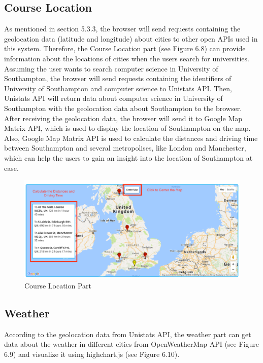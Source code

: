 \subsection{Course Location}

As mentioned in section 5.3.3, the browser will send requests containing the geolocation data (latitude and longitude) about cities to other open APIs used in this system. Therefore, the Course Location part (see Figure 6.8) can provide information about the locations of cities when the users search for universities. Assuming the user wants to search computer science in University of Southampton, the browser will send requests containing the identifiers of University of Southampton and computer science to Unistats API. Then, Unistats API will return data about computer science in University of Southampton with the geolocation data about Southampton to the browser. After receiving the geolocation data, the browser will send it to Google Map Matrix API, which is used to display the location of Southampton on the map. Also, Google Map Matrix API is used to calculate the distances and driving time between Southampton and several metropolises, like London and Manchester, which can help the users to gain an insight into the location of Southampton at ease.

\begin{figure}[H]
  \centering
  \includegraphics[width=15cm]{./img/Picture23}
  \caption{Course Location Part}
  \label{Figure:figex}
\end{figure}


\subsection{Weather}




According to the geolocation data from Unistats API, the weather part can get data about the weather in different cities from OpenWeatherMap API (see Figure 6.9) and visualize it using highchart.js (see Figure 6.10).

